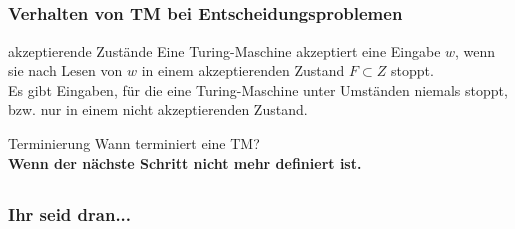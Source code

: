 \subsection*{}
\begin{frame}
  \frametitle{Verhalten von TM bei Entscheidungsproblemen}
\begin{block}{akzeptierende Zustände}
Eine Turing-Maschine akzeptiert eine Eingabe $w$, wenn sie nach Lesen
von $w$ in einem akzeptierenden Zustand $F \subset Z$ stoppt. \\
Es gibt Eingaben, für die eine Turing-Maschine unter Umständen niemals
stoppt, bzw. nur in einem nicht akzeptierenden Zustand.
\end{block} \pause
\begin{block}{Terminierung}
Wann terminiert eine TM? \\ \pause
\textbf{Wenn der nächste Schritt nicht mehr definiert ist.}
\end{block}
\end{frame}


\subsection*{}
\begin{frame}
	\frametitle{Ihr seid dran...}
\end{frame}

